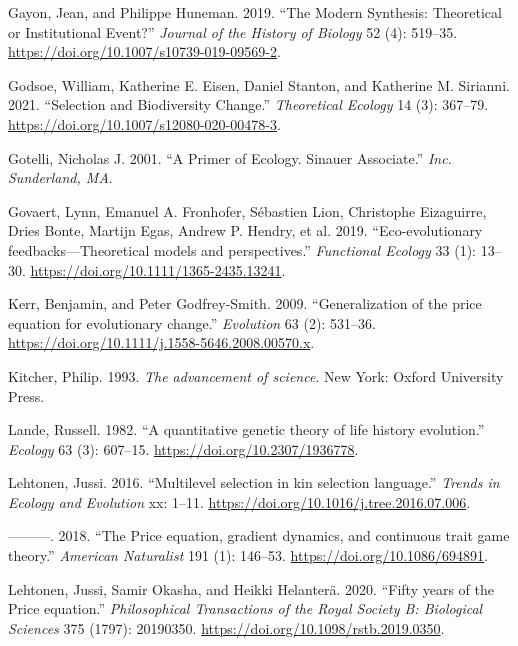\documentclass[
]{article}
\newlength{\cslhangindent}
\newlength{\cslentryspacingunit} %
\newenvironment{CSLReferences}[2] %
 {%
  \setlength{\parindent}{0pt}
  \ifodd #1
  \let\oldpar\par
  \def\par{\hangindent=\cslhangindent\oldpar}
  \fi
  \setlength{\parskip}{#2\cslentryspacingunit}
 }%
 {}
\begin{document}
\begin{CSLReferences}{1}{0}
\leavevmode{}%
Gayon, Jean, and Philippe Huneman. 2019. {``The Modern Synthesis:
Theoretical or Institutional Event?''} \emph{Journal of the History of
Biology} 52 (4): 519--35.
\url{https://doi.org/10.1007/s10739-019-09569-2}.

\leavevmode{}%
Godsoe, William, Katherine E. Eisen, Daniel Stanton, and Katherine M.
Sirianni. 2021. {``Selection and Biodiversity Change.''}
\emph{Theoretical Ecology} 14 (3): 367--79.
\url{https://doi.org/10.1007/s12080-020-00478-3}.

\leavevmode{}%
Gotelli, Nicholas J. 2001. {``A Primer of Ecology. Sinauer Associate.''}
\emph{Inc. Sunderland, MA}.

\leavevmode{}%
Govaert, Lynn, Emanuel A. Fronhofer, Sébastien Lion, Christophe
Eizaguirre, Dries Bonte, Martijn Egas, Andrew P. Hendry, et al. 2019.
{``{Eco-evolutionary feedbacks---Theoretical models and
perspectives}.''} \emph{Functional Ecology} 33 (1): 13--30.
\url{https://doi.org/10.1111/1365-2435.13241}.

\leavevmode{}%
Kerr, Benjamin, and Peter Godfrey-Smith. 2009. {``{Generalization of the
price equation for evolutionary change}.''} \emph{Evolution} 63 (2):
531--36. \url{https://doi.org/10.1111/j.1558-5646.2008.00570.x}.

\leavevmode{}%
Kitcher, Philip. 1993. \emph{{The advancement of science}}. New York:
Oxford University Press.

\leavevmode{}%
Lande, Russell. 1982. {``{A quantitative genetic theory of life history
evolution}.''} \emph{Ecology} 63 (3): 607--15.
\url{https://doi.org/10.2307/1936778}.

\leavevmode{}%
Lehtonen, Jussi. 2016. {``{Multilevel selection in kin selection
language}.''} \emph{Trends in Ecology and Evolution} xx: 1--11.
\url{https://doi.org/10.1016/j.tree.2016.07.006}.

\leavevmode{}%
---------. 2018. {``{The Price equation, gradient dynamics, and
continuous trait game theory}.''} \emph{American Naturalist} 191 (1):
146--53. \url{https://doi.org/10.1086/694891}.

\leavevmode{}%
Lehtonen, Jussi, Samir Okasha, and Heikki Helanterä. 2020. {``{Fifty
years of the Price equation}.''} \emph{Philosophical Transactions of the
Royal Society B: Biological Sciences} 375 (1797): 20190350.
\url{https://doi.org/10.1098/rstb.2019.0350}.


\end{CSLReferences}
\end{document}
